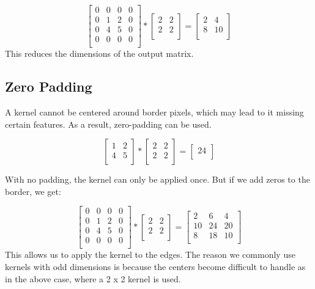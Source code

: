\documentclass{exam}
\begin{document}
\[
\begin{bmatrix}
    0 & 0 & 0 & 0\\
    0 & 1 & 2 & 0\\
    0 & 4 & 5 & 0\\
    0 & 0 & 0 & 0\\
\end{bmatrix}
 *
\begin{bmatrix}
    2 & 2\\
    2 & 2\\
\end{bmatrix}
=
\begin{bmatrix}
    2 & 4\\
    8 & 10\\
\end{bmatrix}
\]
This reduces the dimensions of the output matrix.

\subsection{Zero Padding}
A kernel cannot be centered around border pixels, which may lead to it missing certain features. As a result, zero-padding can be used.

\[
\begin{bmatrix}
    1 & 2\\
    4 & 5\\
\end{bmatrix}
 *
\begin{bmatrix}
    2 & 2\\
    2 & 2\\
\end{bmatrix}
=
\begin{bmatrix}
    24\\
\end{bmatrix}
\]

With no padding, the kernel can only be applied once. But if we add zeros to the border, we get:

\[
\begin{bmatrix}
    0 & 0 & 0 & 0\\
    0 & 1 & 2 & 0\\
    0 & 4 & 5 & 0\\
    0 & 0 & 0 & 0\\
\end{bmatrix}
 *
\begin{bmatrix}
    2 & 2\\
    2 & 2\\
\end{bmatrix}
=
\begin{bmatrix}
    2 & 6 & 4\\
    10 & 24 & 20\\
    8 & 18 & 10\\
\end{bmatrix}
\]
This allows us to apply the kernel to the edges. The reason we commonly use kernels with odd dimensions is because the centers become difficult to handle as in the above case, where a 2 x 2 kernel is used.
\end{document}
